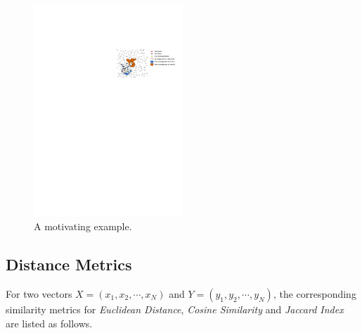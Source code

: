 \begin{figure}[!t]
\centering
\includegraphics[width=0.5\textwidth]{figures/motivate-example.pdf} 
\caption{A motivating example.}\label{motivate-example}
\end{figure}

\subsection{Distance Metrics}
For two vectors $\mathit{X} = (x_1, x_2, \cdots, x_N)$ and $\mathit{Y} = (y_1, y_2, \cdots, y_N)$, the corresponding similarity metrics for \textit{Euclidean Distance}, \textit{Cosine Similarity} and \textit{Jaccard Index} are listed as follows.

